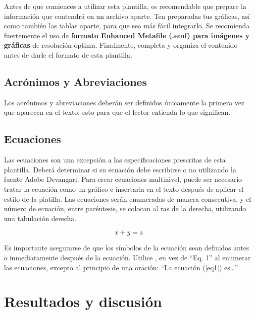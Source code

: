         Antes de que comiences a utilizar esta plantilla, es recomendable que prepare la información que contendrá en un archivo aparte. 
        Ten preparadas tus gráficas, así como también las tablas aparte, para que sea más fácil integrarlo. 
        Se recomienda fuertemente el uso de \textbf{formato Enhanced Metafile (.emf) para imágenes y gráficas} de resolución óptima. 
        Finalmente, completa y organiza el contenido antes de darle el formato de esta plantilla. 
    
        \subsection{Acrónimos y Abreviaciones}
    
        Los acrónimos y abreviaciones deberán ser definidos únicamente la primera vez que aparecen en el texto, esto para que el lector entienda lo que significan.
    
        \subsection{Ecuaciones}
    
        Las ecuaciones son una excepción a las especificaciones prescritas de esta plantilla. 
        Deberá determinar si su ecuación debe escribirse o no utilizando la fuente Adobe Devangari. 
        Para crear ecuaciones multinivel, puede ser necesario tratar la ecuación como un gráfico e insertarla en el texto después de aplicar el estilo de la platilla.
        Las ecuaciones serán enumeradas de manera consecutiva, y el número de ecuación, entre paréntesis, se colocan al ras de la derecha, utilizando una tabulación derecha. 
    
        \begin{equation}
            \label{eq1}
            x + y = z 
        \end{equation}
    
        Es importante asegurarse de que los símbolos de la ecuación sean definidos antes o inmediatamente después de la ecuación. Utilice , en vez de “Eq. 1” al enumerar las ecuaciones, excepto al principio de una oración: “La ecuación (\ref{eq1}) es…”
    
        \newpage
        \section{Resultados y discusión}
    
        
    
